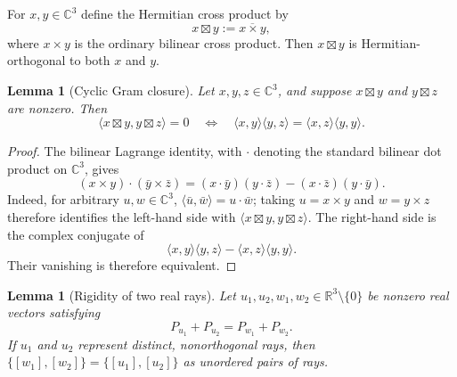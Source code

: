 \documentclass[twocolumn,aps,pra,floatfix,amsmath,amssymb,longbibliography]{revtex4-2}
\newtheorem{lemma}[theorem]{Lemma}
\theoremstyle{definition}
\theoremstyle{remark}
\newcommand{\C}{\mathbb C}
\newcommand{\R}{\mathbb R}
\begin{document}
For $x,y\in\C^3$ define the Hermitian cross product by
\begin{equation}
 x\boxtimes y:=\overline{x\times y},
 \label{eq:hcross}
\end{equation}
where $x\times y$ is the ordinary bilinear cross product.  Then
$x\boxtimes y$ is Hermitian-orthogonal to both $x$ and $y$.

\begin{lemma}[Cyclic Gram closure]
\label{lem:gram-closure}
Let $x,y,z\in\C^3$, and suppose $x\boxtimes y$ and
$y\boxtimes z$ are nonzero.  Then
\begin{equation}
 \langle x\boxtimes y,y\boxtimes z\rangle=0
 \quad\Longleftrightarrow\quad
 \langle x,y\rangle\langle y,z\rangle
 =\langle x,z\rangle\langle y,y\rangle.
 \label{eq:gram-closure}
\end{equation}
\end{lemma}

\begin{proof}
The bilinear Lagrange identity, with $\mathbin{\cdot}$ denoting the standard
bilinear dot product on $\C^3$, gives
\[
 (x\times y)\mathbin{\cdot}(\bar y\times\bar z)
 =(x\mathbin{\cdot}\bar y)(y\mathbin{\cdot}\bar z)
 -(x\mathbin{\cdot}\bar z)(y\mathbin{\cdot}\bar y).
\]
Indeed, for arbitrary $u,w\in\C^3$,
$\langle\bar u,\bar w\rangle=u\mathbin{\cdot}\bar w$; taking
$u=x\times y$ and $w=y\times z$ therefore identifies the left-hand side
with $\langle x\boxtimes y,y\boxtimes z\rangle$.  The right-hand side
is the complex conjugate of
\[
 \langle x,y\rangle\langle y,z\rangle
 -\langle x,z\rangle\langle y,y\rangle.
\]
Their vanishing is therefore equivalent.
\end{proof}

\begin{lemma}[Rigidity of two real rays]
\label{lem:real-rigidity}
Let $u_1,u_2,w_1,w_2\in\R^3\setminus\{0\}$ be nonzero real vectors satisfying
\begin{equation}
 P_{u_1}+P_{u_2}=P_{w_1}+P_{w_2}.
 \label{eq:two-sums}
\end{equation}
If $u_1$ and $u_2$ represent distinct, nonorthogonal rays, then
$\{[w_1],[w_2]\}=\{[u_1],[u_2]\}$ as unordered pairs of rays.
\end{lemma}
\end{document}
